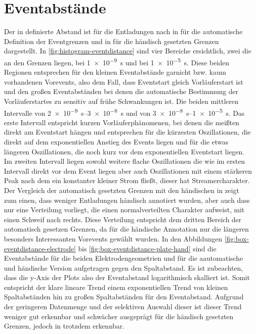 \section{Eventabstände}

Der in  definierte Abstand ist für die Entladungen nach  in  für die automatische Definition der Eventgrenzen und in  für die händisch gesetzten Grenzen dargestellt. In \ref{fig:histogram-eventdistance} sind vier Bereiche ersichtlich, zwei die an den Grenzen liegen, bei \SI{1e-9}{\second} und bei \SI{1e-5}{\second}. Diese beiden Regionen entsprechen für den kleinen Eventabstände garnicht bzw. kaum vorhandenen Vorevents, also dem Fall, dass Eventstart gleich Vorläuferstart ist und den großen Eventabständen bei denen die automatische Bestimmung der Vorläuferstartes zu sensitiv auf frühe Schwankungen ist. Die beiden mittleren Intervalle von \SIrange{2e-9}{3e-8}{\second} und von \SIrange{3e-8}{1e-5}{\second}. Das erste Intervall entspricht kurzen Vorläuferphänomenen, bei denen die meißten direkt am Eventstart hängen und entsprechen für die kürzesten Oszillationen, die direkt auf dem exponentiellen Anstieg des Events liegen und für die etwas längeren Oszillationen, die noch kurz vor dem exponentiellen Eventstart liegen. Im zweiten Intervall liegen sowohl weitere flache Oszillationen die wie im ersten Intervall direkt vor dem Event liegen aber auch Oszillationen mit einem stärkeren Peak nach dem ein konstanter kleiner Strom fließt, dieser hat Streamercharakter. Der Vergleich der automatisch gesetzten Grenzen mit den händischen in  zeigt zum einen, dass weniger Entladungen händisch annotiert wurden, aber auch dass nur eine Verteilung vorliegt, die einen normalverteilten Charakter aufweist, mit einen Schweif nach rechts. Diese Verteilung entspricht dem dritten Bereich der automatisch gesetzen Grenzen, da für die händische Annotation nur die längeren besonders Interessanten Vorevents gewählt wurden. In den Abbildungen \ref{fig:box-eventdistance-electrode} bis \ref{fig:box-eventdistance-plate-hand} sind die Eventabstände für die beiden Elektrodengeometrien und für die aautomatische und händische Version aufgetragen gegen den Spaltabstand. Es ist zubeachten, dass die y-Axis der Plots also der Eventabstand logarithmisch skalliert ist. Somit entspricht der klare lineare Trend einem exponentiellen Trend von kleinen Spaltabständen hin zu großen Spaltabständen für den Eventabstand. Aufgrund der geringeren Datenmenge und der selektiven Auswahl dieser ist dieser Trend weniger gut erkennbar und schwächer ausgeprägt für die händisch gesetzten Grenzen, jedoch in  trotzdem erkennbar.







